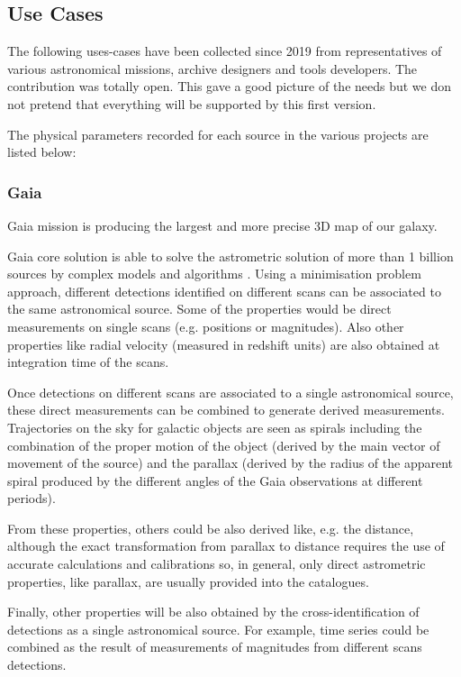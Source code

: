 \documentclass[11pt,a4paper]{ivoa}
\newcommand{\TODO}[1]{%
    \noindent%
    \colorbox{todocolor}{%
            \parbox{0.85\linewidth}{\sffamily \textbf{TODO:}\\
            #1}
    }%
    \vspace{2pt}

}
\begin{document}
\subsection{Use Cases}
The following uses-cases have been collected since 2019 from representatives of various astronomical missions, archive designers and tools developers.
The contribution was totally open. This gave a good picture of the needs but we don not pretend that everything will be supported by this first version.


The physical parameters recorded for each source in the various projects are listed below:
\subsubsection{Gaia}
Gaia mission is producing the largest and more precise 3D map of our galaxy.

Gaia core solution is able to solve the astrometric solution of more than 1
billion sources by complex models and algorithms \citep{2012A&A...538A..78L}.
Using a minimisation problem approach, different detections identified on
different scans can be associated to the same astronomical source. Some of the
properties would be direct measurements on single scans (e.g. positions or
magnitudes). Also other properties like radial velocity (measured in redshift
units) are also obtained at integration time of the scans.

Once detections on different scans are associated to a single astronomical
source, these direct measurements can be combined to generate derived
measurements. Trajectories on the sky for galactic objects are seen as
spirals including the combination of the proper motion of the object
(derived by the main vector of movement of the source) and the parallax
(derived by the radius of the apparent spiral produced by the different
angles of the Gaia observations at different periods).

From these properties, others could be also derived like, e.g. the distance,
although the exact transformation from parallax to distance requires the use of
accurate calculations and calibrations so, in general, only direct astrometric
properties, like parallax, are usually provided into the catalogues.

Finally, other properties will be also obtained by the cross-identification of
detections as a single astronomical source. For example, time series could be
combined as the result of measurements of magnitudes from different scans
detections.
\end{document}
